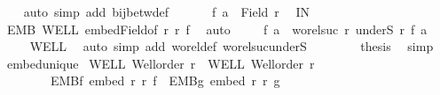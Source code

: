 \begin{isabellebody}
\ \ \isamarkupfalse%
\ {\isacharparenleft}{\kern0pt}auto\ simp\ add{\isacharcolon}{\kern0pt}\ bij{\isacharunderscore}{\kern0pt}betw{\isacharunderscore}{\kern0pt}def{\isacharparenright}{\kern0pt}\isanewline
\ \ \isamarkupfalse%
\isanewline
\ \ \isacommand{{\isacharbraceleft}{\kern0pt}}\isamarkupfalse%
\isamarkupfalse%
\ {\isachardoublequoteopen}f\ a\ {\isasymin}\ Field\ r{\isacharprime}{\kern0pt}{\isachardoublequoteclose}\ \isamarkupfalse%
\ IN\isanewline
\ \ \ \isamarkupfalse%
\ EMB\ WELL\ embed{\isacharunderscore}{\kern0pt}Field{\isacharbrackleft}{\kern0pt}of\ r\ r{\isacharprime}{\kern0pt}\ f{\isacharbrackright}{\kern0pt}\ \isamarkupfalse%
\ auto\isanewline
\ \ \ \isamarkupfalse%
\ {\isachardoublequoteopen}f\ a\ {\isacharequal}{\kern0pt}\ wo{\isacharunderscore}{\kern0pt}rel{\isachardot}{\kern0pt}suc\ r{\isacharprime}{\kern0pt}\ {\isacharparenleft}{\kern0pt}underS\ r{\isacharprime}{\kern0pt}\ {\isacharparenleft}{\kern0pt}f\ a{\isacharparenright}{\kern0pt}{\isacharparenright}{\kern0pt}{\isachardoublequoteclose}\isanewline
\ \ \ \isamarkupfalse%
\ WELL{\isacharprime}{\kern0pt}\ \isamarkupfalse%
\ {\isacharparenleft}{\kern0pt}auto\ simp\ add{\isacharcolon}{\kern0pt}\ wo{\isacharunderscore}{\kern0pt}rel{\isacharunderscore}{\kern0pt}def\ wo{\isacharunderscore}{\kern0pt}rel{\isachardot}{\kern0pt}suc{\isacharunderscore}{\kern0pt}underS{\isacharparenright}{\kern0pt}\isanewline
\ \ \isacommand{{\isacharbraceright}{\kern0pt}}\isamarkupfalse%
\isanewline
\ \ \isamarkupfalse%
\ \isamarkupfalse%
\ {\isacharquery}{\kern0pt}thesis\ \isamarkupfalse%
\ simp\isanewline
{}\isamarkupfalse%
%
\endisatagproof
{\isafoldproof}%
%
\isadelimproof
\isanewline
%
\endisadelimproof
\isanewline
{}\isamarkupfalse%
\ embed{\isacharunderscore}{\kern0pt}unique{\isacharcolon}{\kern0pt}\isanewline
{}\ WELL{\isacharcolon}{\kern0pt}\ {\isachardoublequoteopen}Well{\isacharunderscore}{\kern0pt}order\ r{\isachardoublequoteclose}\ \ WELL{\isacharprime}{\kern0pt}{\isacharcolon}{\kern0pt}\ {\isachardoublequoteopen}Well{\isacharunderscore}{\kern0pt}order\ r{\isacharprime}{\kern0pt}{\isachardoublequoteclose}\ \isanewline
\ \ \ \ \ \ \ \ EMBf{\isacharcolon}{\kern0pt}\ {\isachardoublequoteopen}embed\ r\ r{\isacharprime}{\kern0pt}\ f{\isachardoublequoteclose}\ \ EMBg{\isacharcolon}{\kern0pt}\ {\isachardoublequoteopen}embed\ r\ r{\isacharprime}{\kern0pt}\ g{\isachardoublequoteclose}\isanewline

\end{isabellebody}
